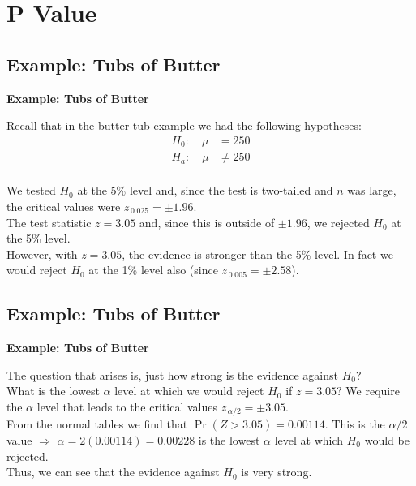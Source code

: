 \documentclass[compress]{beamer}        %
\makeatletter
\newcommand{\tcb}{\textcolor{beamer@blendedblue}}
\makeatother
\begin{document}
\section{P Value}
\subsection{Example: Tubs of Butter}
\begin{frame}{\bf \tcb{Example: Tubs of Butter}}

Recall that in the butter tub example we had the following hypotheses:
\begin{align*}
H_0: \quad \mu &= 250\\
H_a: \quad \mu &\ne 250\\[-0.3cm]
\end{align*}

We tested $H_0$ at the 5\% level and, since the test is two-tailed and $n$ was large, the critical values were $z_{\,0.025} = \pm 1.96$.\\[0.6cm]


The test statistic $z = 3.05$ and, since this is outside of $\pm 1.96$, we rejected $H_0$ at the 5\% level.\\[0.6cm]

However, with $z=3.05$, the evidence is stronger than the 5\% level. In fact we would reject $H_0$ at the 1\% level also (since $z_{\,0.005} = \pm 2.58$).

\end{frame}


\subsection{Example: Tubs of Butter}
\begin{frame}{\bf \tcb{Example: Tubs of Butter}}

The question that arises is, just how strong is the evidence against $H_0$?\\[0.9cm]

What is the lowest $\alpha$ level at which we would reject $H_0$ if $z=3.05$? We require the $\alpha$ level that leads to the critical values $z_{\,\alpha/2} = \pm 3.05$.\\[0.9cm]

From the normal tables we find that $\Pr(Z > 3.05) = 0.00114$. This is the $\alpha/2$ value $\Rightarrow$ $\alpha = 2(0.00114) = 0.00228$ is the lowest $\alpha$ level at which $H_0$ would be rejected.\\[0.9cm]

Thus, we can see that the evidence against $H_0$ is very strong.

\end{frame}
\end{document}
